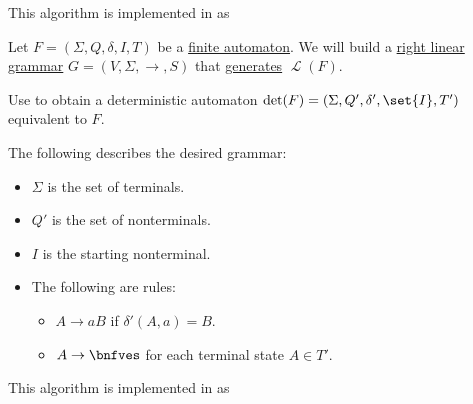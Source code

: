 \begin{comments}
  \item This algorithm is implemented in \cite{notebook:code} as
  \begin{CodeRefDisplay}
  \end{CodeRefDisplay}
\end{comments}

\begin{algorithm}\label{alg:finite_automaton_to_right_linear_grammar}
  Let \( F = (\Sigma, Q, \delta, I, T) \) be a \hyperref[def:finite_automaton]{finite automaton}. We will build a \hyperref[def:chomsky_hierarchy/regular]{right linear grammar} \( G = (V, \Sigma, \to, S) \) that \hyperref[def:formal_grammar/language]{generates} \( \mscrL(F) \).

  \begin{thmenum}
     Use  to obtain a deterministic automaton \( \det(F) = (\Sigma, Q', \delta', \set{ I }, T') \) equivalent to \( F \).

     The following describes the desired grammar:
    \begin{itemize}
      \item \( \Sigma \) is the set of terminals.
      \item \( Q' \) is the set of nonterminals.
      \item \( I \) is the starting nonterminal.
      \item The following are rules:
      \begin{itemize}
        \item \( A \to aB \) if \( \delta'(A, a) = B \).
        \item \( A \to \bnfves \) for each terminal state \( A \in T' \).
      \end{itemize}
    \end{itemize}
  \end{thmenum}
\end{algorithm}
\begin{comments}
  \item This algorithm is implemented in \cite{notebook:code} as
  \begin{CodeRefDisplay}
  \end{CodeRefDisplay}
\end{comments}


